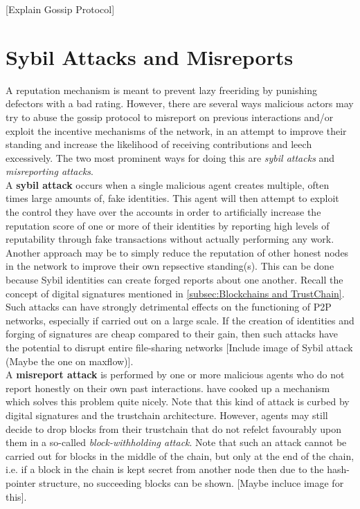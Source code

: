 \documentclass[11pt,a4paper]{report}
\theoremstyle{definition}
\theoremstyle{theorem}
\theoremstyle{proposition}
\theoremstyle{corollary}
\theoremstyle{lemma}
\theoremstyle{example}
\theoremstyle{remark}
\begin{document}
\noindent{}\begin{center} [Explain Gossip Protocol] \end{center}

\section{Sybil Attacks and Misreports}
\label{sec:Sybil Attacks and Misreports}
\noindent{}A reputation mechanism is meant to prevent lazy freeriding by punishing defectors with a bad rating. However, there are several ways malicious actors may try to abuse the gossip protocol to misreport on previous interactions and/or exploit the incentive mechanisms of the network, in an attempt to improve their standing and increase the likelihood of receiving contributions and leech excessively. The two most prominent ways for doing this are {\it sybil attacks} and {\it misreporting attacks}. \vspace{1em}\\

\noindent{}A {\bf sybil attack} occurs when a single malicious agent creates multiple, often times large amounts of, fake identities. This agent will then attempt to exploit the control they have over the accounts in order to artificially increase the reputation score of one or more of their identities by reporting high levels of reputability through fake transactions without actually performing any work. Another approach may be to simply reduce the reputation of other honest nodes in the network to improve their own repsective standing(s). This can be done because Sybil identities can create forged reports about one another. Recall the concept of digital signatures mentioned in \ref{subsec:Blockchains and TrustChain}. Such attacks can have strongly detrimental effects on the functioning of P2P networks, especially if carried out on a large scale. If the creation of identities and forging of signatures are cheap compared to their gain, then such attacks have the potential to disrupt entire file-sharing networks [Include image of Sybil attack (Maybe the one on maxflow)].  \vspace{1em}\\

\noindent{}A {\bf misreport attack} is performed by one or more malicious agents who do not report honestly on their own past interactions. \cite{DropEdge} have cooked up a mechanism which solves this problem quite nicely. Note that this kind of attack is curbed by digital signatures and the trustchain architecture. However, agents may still decide to drop blocks from their trustchain that do not refelct favourably upon them in a so-called {\it block-withholding attack}. Note that such an attack cannot be carried out for blocks in the middle of the chain, but only at the end of the chain, i.e. if a block in the chain is kept secret from another node then due to the hash-pointer structure, no succeeding blocks can be shown. [Maybe incluce image for this].\vspace{1em}\\ 
\end{document}
